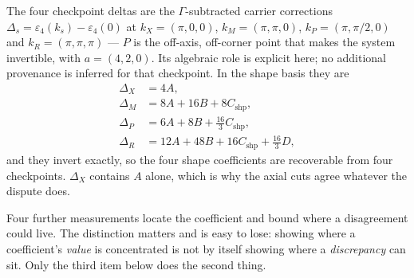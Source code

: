 \documentclass[11pt]{article}
\theoremstyle{plain}
\theoremstyle{definition}
\theoremstyle{remark}
\newcommand{\chk}[1]{}
\begin{document}
The four checkpoint deltas are the $\Gamma$-subtracted carrier corrections
$\Delta_s=\varepsilon_4(k_s)-\varepsilon_4(0)$ at
$k_X=(\pi,0,0)$, $k_M=(\pi,\pi,0)$, $k_P=(\pi,\pi/2,0)$ and
$k_R=(\pi,\pi,\pi)$ --- $P$ is the off-axis, off-corner point that makes the
system invertible, with $a=(4,2,0)$. Its algebraic role is explicit here; no
additional provenance is inferred for that checkpoint. In the shape basis they are
\begin{equation}\label{eq:checkpoints}
\begin{aligned}
  \Delta_X&=4A,\\
  \Delta_M&=8A+16B+8C_{\mathrm{shp}},\\
  \Delta_P&=6A+8B+\tfrac{16}3C_{\mathrm{shp}},\\
  \Delta_R&=12A+48B+16C_{\mathrm{shp}}+\tfrac{16}3D,
\end{aligned}
\end{equation}
and they invert exactly, so the four shape coefficients are recoverable from
four checkpoints. $\Delta_X$ contains $A$ alone, which is why the axial cuts
agree whatever the dispute does.
\chk{checkpoint values at X, M, P, R}
\chk{the four extraction formulas invert the ansatz}
\chk{X is blind to B, C, D — it fixes A alone}

Four further measurements locate the coefficient and bound where a
disagreement could live. The distinction matters and is easy to lose: showing
where a coefficient's \emph{value} is concentrated is not by itself showing
where a \emph{discrepancy} can sit. Only the third item below does the second
thing.
\end{document}
